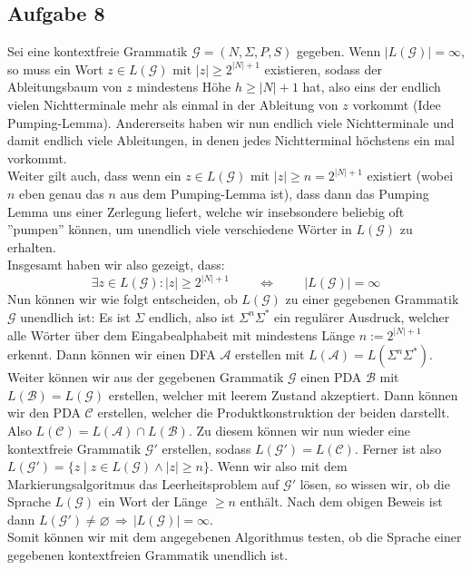 \documentclass[a4paper,graphics,11pt]{article}
\newcommand{\aufgabe}[1]{\subsection*{Aufgabe #1}}
\begin{document}
\aufgabe{8}
Sei eine kontextfreie Grammatik $\mathcal{G} = (N, \Sigma, P, S)$ gegeben.
Wenn $|L(\mathcal{G})| = \infty$, so muss ein Wort $z \in L(\mathcal{G})$
mit $|z| \geq 2^{|N|+1}$ existieren, sodass der Ableitungsbaum
von $z$ mindestens Höhe $h \geq |N| + 1$ hat, also eins der endlich vielen
Nichtterminale mehr als einmal in der Ableitung von $z$ vorkommt (Idee Pumping-Lemma).
Andererseits haben wir nun endlich viele Nichtterminale und damit endlich viele
Ableitungen, in denen jedes Nichtterminal höchstens ein mal vorkommt.\\
Weiter gilt auch, dass wenn ein $z \in L(\mathcal{G})$ mit $|z| \geq n = 2^{|N|+1}$
existiert (wobei $n$ eben genau das $n$ aus dem Pumping-Lemma ist), dass
dann das Pumping Lemma uns einer Zerlegung liefert, welche wir insebsondere beliebig
oft ''pumpen'' können, um unendlich viele verschiedene Wörter in $L(\mathcal{G})$ 
zu erhalten.\\
Insgesamt haben wir also gezeigt, dass:
$$
    \exists z \in L(\mathcal{G}) : |z| \geq 2^{|N|+1}
    \qquad \,\Longleftrightarrow\,\qquad
    |L(\mathcal{G})| = \infty
$$
Nun können wir wie folgt entscheiden, ob $L(\mathcal{G})$ zu einer gegebenen 
Grammatik $\mathcal{G}$ unendlich ist:
Es ist $\Sigma$ endlich, also ist $\Sigma^n\Sigma^*$ ein regulärer Ausdruck,
welcher alle Wörter über dem Eingabealphabeit mit mindestens Länge $n := 2^{|N|+1}$
erkennt. Dann können wir einen DFA $\mathcal{A}$ erstellen mit $L(\mathcal{A}) =
L(\Sigma^n\Sigma^*)$. Weiter können wir aus der gegebenen Grammatik $\mathcal{G}$
einen PDA $\mathcal{B}$ mit $L(\mathcal{B}) = L(\mathcal{G})$ erstellen, welcher
mit leerem Zustand akzeptiert. Dann können wir den PDA $\mathcal{C}$ erstellen, welcher
die Produktkonstruktion der beiden darstellt.
Also $L(\mathcal{C}) = L(\mathcal{A}) \cap L(\mathcal{B})$.
Zu diesem können wir nun wieder eine kontextfreie Grammatik $\mathcal{G}'$ erstellen,
sodass $L(\mathcal{G}') = L(\mathcal{C}) $. Ferner ist also
$L(\mathcal{G}') = \{z \mid z \in L(\mathcal{G}) \land |z| \geq n\}$.
Wenn wir also mit dem Markierungsalgoritmus das Leerheitsproblem auf $\mathcal{G}'$
lösen, so wissen wir, ob die Sprache $L(\mathcal{G})$ ein Wort der Länge $\geq n$ enthält.
Nach dem obigen Beweis ist dann
$
    L(\mathcal{G}') \neq \varnothing \,\Longrightarrow\, |L(\mathcal{G})| = \infty
$.\\
Somit können wir mit dem angegebenen Algorithmus testen, ob die Sprache einer
gegebenen kontextfreien Grammatik unendlich ist.
\end{document}
